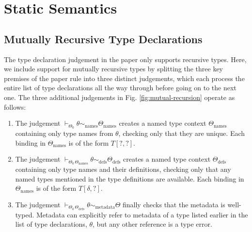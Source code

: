 \section{Static Semantics}
\subsection{Mutually Recursive Type Declarations}

The type declaration judgement in the paper only supports recursive types. Here, we include support for mutually recursive types by splitting the three key premises of the paper rule into three distinct judgements, which each process the entire list of type declarations all the way through before going on to the next one. The three additional judgements in Fig. \ref{fig:mutual-recursion} operate as follows:
\begin{enumerate}
\item The judgement $\vdash_{\Theta_0} \theta \sim_{\text{names}} \Theta_{\text{names}}$ creates a named type context $\Theta_{\text{names}}$ containing only type names from $\theta$, checking only that they are unique. Each binding in $\Theta_{\text{names}}$ is of the form $T[?, ?]$.
\item The judgement $\vdash_{\Theta_{0}\,\Theta_{\text{names}}} \theta \sim_{\text{defs}} \Theta_{\text{defs}}$ creates a named type context $\Theta_{\text{defs}}$ containing only type names and their definitions, checking only that any named types mentioned in the type definitions are available. Each binding in $\Theta_{\text{names}}$ is of the form $T[\delta, ?]$.
\item The judgement $\vdash_{\Theta_{0}\,\Theta_{\text{defs}}} \theta \sim_{\text{metadata}} \Theta$ finally checks that the metadata is well-typed. Metadata can explicitly refer to metadata of a type listed earlier in the list of type declarations, $\theta$, but any other reference is a type error.
\end{enumerate}

